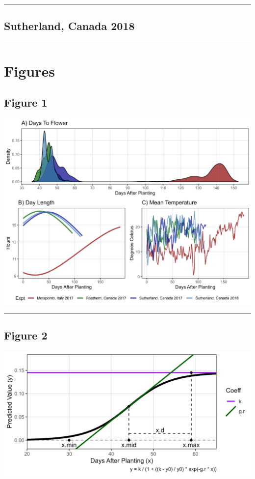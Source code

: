 \documentclass[
]{article}
\begin{document}
\begin{center}\rule{0.5\linewidth}{0.5pt}\end{center}

\subsection{Sutherland, Canada 2018}\label{sutherland-canada-2018}

\begin{center}\rule{0.5\linewidth}{0.5pt}\end{center}

\section{Figures}\label{figures}

\subsection{Figure 1}\label{figure-1}

\includegraphics{Figure_01.png}

\begin{center}\rule{0.5\linewidth}{0.5pt}\end{center}

\subsection{Figure 2}\label{figure-2}

\includegraphics{Figure_02.png}
\end{document}
